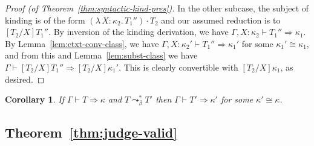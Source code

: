 \documentclass{article}
\newcommand{\abs}[4]{{#1}\, #2\! : \! #3.\, #4}
\newcommand{\tpsynth}[0]{\Rightarrow}
\newtheorem{corollary}[theorem]{Corollary}
\begin{document}
\begin{proof}[Proof (of Theorem~\ref{thm:syntactic-kind-pres})]
  In the other subcase, the subject of kinding is of the form
  \((\abs{\lambda}{X}{\kappa_2}{T_1''}) \cdot T_2\) and our assumed reduction is
  to \([T_2/X]T_1''\).
  By inversion of the kinding derivation, we have \(\Gamma,X:\kappa_2 \vdash
  T_1'' \tpsynth \kappa_1\).
  By Lemma~\ref{lem:ctxt-conv-class}, we have \(\Gamma,X:\kappa_2' \vdash T_1''
  \tpsynth \kappa_1'\) for some \(\kappa_1' \cong \kappa_1\), and from this and
  Lemma~\ref{lem:subst-class} we have \(\Gamma \vdash [T_2/X]T_1'' \tpsynth
  [T_2/X]\kappa_1'\).
  This is clearly convertible with \([T_2/X]\kappa_1\), as desired.
\end{proof}

\begin{corollary}
  \label{cor:syntactic-kind-pres}
  If \(\Gamma \vdash T \tpsynth \kappa\) and \(T \leadsto_\beta^* T'\) then
  \(\Gamma \vdash T' \tpsynth \kappa'\) for some \(\kappa' \cong \kappa\).
\end{corollary}

\subsection{Theorem~\ref{thm:judge-valid}}
\end{document}
